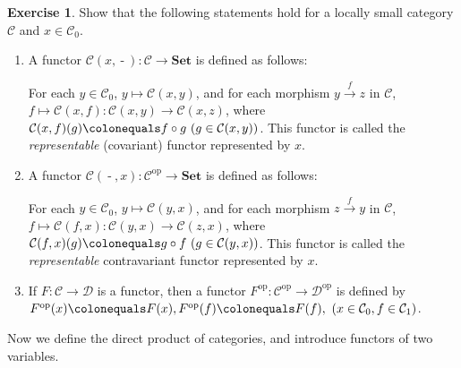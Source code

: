 \documentclass{surv-l}
\numberwithin{equation}{chapter}
\numberwithin{figure}{chapter}
\theoremstyle{plain}
\theoremstyle{definition}
\newtheorem{exc}[thm]{Exercise}
\theoremstyle{remark}
\DeclareMathOperator{\blank}{-}
\begin{document}
\begin{exc}\label{exc:representable-set}
Show that the following statements hold for a locally small category ${\mathcal{C}}$ and $x \in {\mathcal{C}}_0$.
\begin{enumerate}
\item
A functor ${\mathcal{C}}(x, \blank)\colon {\mathcal{C}} \to \mathbf{Set}$ is defined as follows:

For each $y \in {\mathcal{C}}_0$, $y \mapsto {\mathcal{C}}(x, y)$, and
for each morphism $y \xrightarrow{f} z$ in ${\mathcal{C}}$,
$f \mapsto {\mathcal{C}}(x, f) \colon {\mathcal{C}}(x, y) \to {\mathcal{C}}(x, z)$,
where ${\mathcal{C}}(x, f)(g)\colonequals  f \circ g \ (g \in {\mathcal{C}}(x, y))$.
This functor is called the \emph{representable} (covariant) functor represented by $x$.
\item
A functor ${\mathcal{C}}(\blank, x)\colon {\mathcal{C}}^{\mathrm{op}} \to \mathbf{Set}$ is defined as follows:

For each $y \in {\mathcal{C}}_0$, $y \mapsto {\mathcal{C}}(y, x)$, and
for each morphism $z \xrightarrow{f} y$ in ${\mathcal{C}}$,
$f \mapsto {\mathcal{C}}(f, x) \colon {\mathcal{C}}(y, x) \to {\mathcal{C}}(z, x)$,
where ${\mathcal{C}}(f,x)(g)\colonequals  g \circ f \ (g \in {\mathcal{C}}(y,x))$.
This functor is called the \emph{representable} contravariant functor represented by $x$.
\item
If $F \colon {\mathcal{C}} \to {\mathcal{D}}$ is a functor, then a functor
$F^{\mathrm{op}} \colon {\mathcal{C}}^{\mathrm{op}} \to {\mathcal{D}}^{\mathrm{op}}$ is defined by
$F^{\mathrm{op}}(x)\colonequals  F(x), F^{\mathrm{op}}(f)\colonequals  F(f), \ (x \in {\mathcal{C}}_0, f \in {\mathcal{C}}_1)$.
\end{enumerate}
\end{exc}

Now we define the direct product of categories, and introduce functors of two variables.
\end{document}
